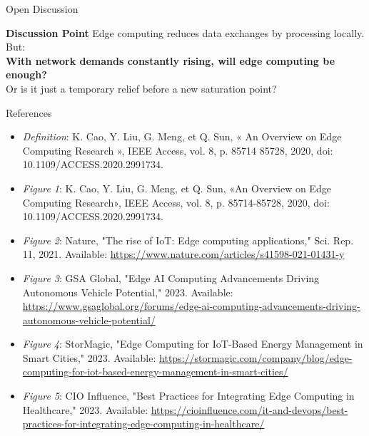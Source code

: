 \documentclass{beamer}
\begin{document}
\begin{frame}{Open Discussion}
  \begin{block}{\textbf{Discussion Point}}
    Edge computing reduces data exchanges by processing locally. But:\\
    \textbf{With network demands constantly rising, will edge computing be enough?}\\
    Or is it just a temporary relief before a new saturation point?
  \end{block}
\end{frame}


\begin{frame}{References}
    \footnotesize
    \begin{itemize}
        \item \textit{Definition}: K. Cao, Y. Liu, G. Meng, et Q. Sun, « An Overview on Edge Computing Research », IEEE Access, vol. 8, p. 85714 85728, 2020, doi: 10.1109/ACCESS.2020.2991734.
        \item \textit{Figure 1}: K. Cao, Y. Liu, G. Meng, et Q. Sun, «An Overview on Edge Computing Research», IEEE Access, vol. 8, p. 85714-85728, 2020, doi: 10.1109/ACCESS.2020.2991734.
        \item \textit{Figure 2}: Nature, "The rise of IoT: Edge computing applications," Sci. Rep. 11, 2021. Available: \url{https://www.nature.com/articles/s41598-021-01431-y}
        \item \textit{Figure 3}: GSA Global, "Edge AI Computing Advancements Driving Autonomous Vehicle Potential," 2023. Available: \url{https://www.gsaglobal.org/forums/edge-ai-computing-advancements-driving-autonomous-vehicle-potential/}
        \item \textit{Figure 4}: StorMagic, "Edge Computing for IoT-Based Energy Management in Smart Cities," 2023. Available: \url{https://stormagic.com/company/blog/edge-computing-for-iot-based-energy-management-in-smart-cities/}
        \item \textit{Figure 5}: CIO Influence, "Best Practices for Integrating Edge Computing in Healthcare," 2023. Available: \url{https://cioinfluence.com/it-and-devops/best-practices-for-integrating-edge-computing-in-healthcare/}
    \end{itemize}
\end{frame}
\end{document}
